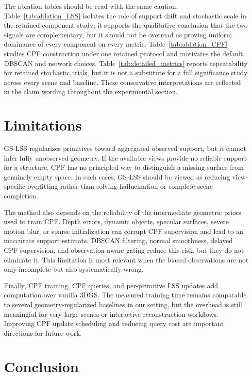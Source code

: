 \documentclass[lettersize,journal]{IEEEtran}
\begin{document}
The ablation tables should be read with the same caution. Table~\ref{tab:ablation_LSS} isolates the role of support drift and stochastic scale in the retained component study; it supports the qualitative conclusion that the two signals are complementary, but it should not be overread as proving uniform dominance of every component on every metric. Table~\ref{tab:ablation_CPF} studies CPF construction under one retained protocol and motivates the default DBSCAN and network choices. Table~\ref{tab:detailed_metrics} reports repeatability for retained stochastic trials, but it is not a substitute for a full significance study across every scene and baseline. These conservative interpretations are reflected in the claim wording throughout the experimental section.

\section{Limitations}

GS-LSS regularizes primitives toward aggregated observed support, but it cannot infer fully unobserved geometry. If the available views provide no reliable support for a structure, CPF has no principled way to distinguish a missing surface from genuinely empty space. In such cases, GS-LSS should be viewed as reducing view-specific overfitting rather than solving hallucination or complete scene completion.

The method also depends on the reliability of the intermediate geometric priors used to train CPF. Depth errors, dynamic objects, specular surfaces, severe motion blur, or sparse initialization can corrupt CPF supervision and lead to an inaccurate support estimate. DBSCAN filtering, normal smoothness, delayed CPF supervision, and observation-aware gating reduce this risk, but they do not eliminate it. This limitation is most relevant when the biased observations are not only incomplete but also systematically wrong.

Finally, CPF training, CPF queries, and per-primitive LSS updates add computation over vanilla 3DGS. The measured training time remains comparable to several geometry-regularized baselines in our setting, but the overhead is still meaningful for very large scenes or interactive reconstruction workflows. Improving CPF update scheduling and reducing query cost are important directions for future work.

\section{Conclusion}
\end{document}
